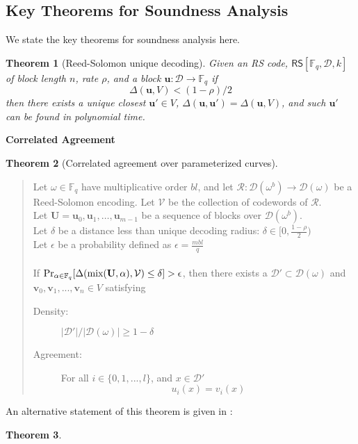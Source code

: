 \documentclass[10pt,letterpaper,titlepage]{article}
\newcommand{\GF}[1]{\mathbb{F}_{#1}}
\newcommand{\w}[0]{\omega}
\newcommand{\p}[0]{\rho}
\newcommand{\D}[0]{\mathcal{D}}
\newtheorem{theorem}{Theorem}
\theoremstyle{definition}
\begin{document}
\begin{appendices}
\section{Key Theorems for Soundness Analysis}
\label{soundness theorems}
We state the key theorems for soundness analysis here. 
\\
\begin{theorem}[Reed-Solomon unique decoding]
  \label{uniq-decode}
  Given an RS code, $\mathsf{RS}[\GF{q}, \D, k]$ of block length $n$, rate $\p$, and a block $\mathbf{u} : \D \rightarrow \GF{q}$ if
  \[
    \Delta(\mathbf{u}, V) < (1 - \p)/2
  \]
  then there exists a unique closest $\mathbf{u'} \in V$, $\Delta(\mathbf{u}, \mathbf{u'}) = \Delta(\mathbf{u}, V)$, and such $\mathbf{u'}$ can be found in polynomial time.
\end{theorem}
\noindent
\textbf{Correlated Agreement}
\begin{theorem}[Correlated agreement over parameterized curves]
  \label{delta-close}
  \end{theorem}
  \begin{quote} Let $\w\in\GF{q}$ have multiplicative order $bl$, and let $\mathcal{R}:\D(\w^b)\to\D(\w)$ be a Reed-Solomon encoding. Let $\mathcal{V}$ be the collection of codewords of $\mathcal{R}$. \\
    Let $\mathbf{U}=\mathbf{u}_0,\mathbf{u}_1,\ldots,\mathbf{u}_{m-1}$ be a sequence of blocks over $\D(\w^b)$.\\
   Let $\delta$ be a distance less than unique decoding radius: $\delta \in [0, \frac{1 - \p}{2})$\\
    Let $\epsilon$ be a probability defined as
            $\epsilon = \frac{m bl}{q}$\\
            \\
    If $\Pr_{\alpha \in \GF{q}} [\Delta(\textrm{mix}(\bold{U},\alpha), \mathcal{V}) \le \delta] > \epsilon $,
    then there exists a $\D' \subset \D(\w)$ and $\mathbf{v}_0, \mathbf{v}_1, ..., \mathbf{v}_n \in V$ satisfying
    \begin{description}
      \item[Density:] $|\D'|/|\D(\w)| \ge 1 - \delta$
      \item[Agreement:] For all $i \in \{0, 1, ..., l\}$, and $x \in \D'$ \[
          u_i(x) = v_i(x)
        \]
    \end{description}
  \end{quote}
An alternative statement of this theorem is given in \cite{FRIsummary}:
\begin{theorem}

\end{theorem}
\end{appendices}
\end{document}
